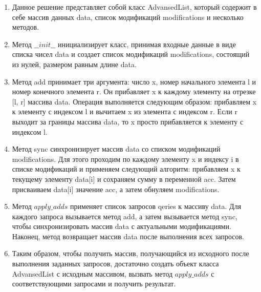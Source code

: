 \begin{enumerate}

\item Данное решение представляет собой класс AdvansedList, 
который содержит в себе массив данных data, список модификаций modifications и несколько методов.

\item Метод $\_\_init\_\_$ инициализирует класс, принимая входные данные в виде списка чисел data и создает список модификаций modifications, состоящий из нулей, размером равным длине data.

\item Метод add принимает три аргумента: число x, номер начального элемента l и номер конечного элемента r. Он прибавляет x к каждому элементу на отрезке [l, r] массива data. Операция выполняется следующим образом: прибавляем x к элементу с индексом l и вычитаем x из элемента с индексом r. Если r выходит за границы массива data, то x просто прибавляется к элементу с индексом l.

\item Метод sync синхронизирует массив data со списком модификаций modifications. Для этого проходим по каждому элементу x и индексу i в списке модификаций и применяем следующий алгоритм: прибавляем x к текущему элементу data[i] и сохраняем сумму в переменной acc. Затем присваиваем data[i] значение acc, а затем обнуляем modifications.

\item Метод $apply\_adds$ применяет список запросов qeries к массиву data. Для каждого запроса вызывается метод add, а затем вызывается метод sync, чтобы синхронизировать массив data с актуальными модификациями. Наконец, метод возвращает массив data после выполнения всех запросов.

\item Таким образом, чтобы получить массив, получающийся из исходного после выполнения заданных запросов, достаточно создать объект класса AdvansedList с исходным массивом, вызвать метод $apply\_adds$ с соответствующими запросами и получить результат.

\end{enumerate}